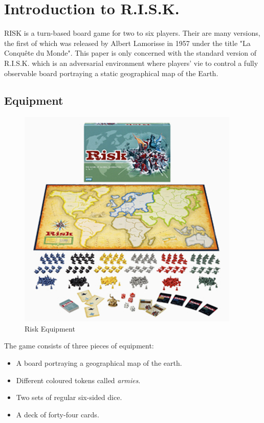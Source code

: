 \documentclass[parskip]{cs4rep}
\begin{document}
\newpage

\section{Introduction to R.I.S.K.}

RISK is a turn-based board game for two to six players. Their are many versions, the first of which was released by Albert Lamorisse in 1957 under the title "La Conqu\^ete du Monde". This paper is only concerned with the standard version of R.I.S.K. which is an adversarial environment where players' vie to control a fully observable board portraying a static geographical map of the Earth.

\subsection{Equipment}

\begin{figure}[h]
\centering
\includegraphics{images/risk-board}
\caption{Risk Equipment \cite{riskimage}}
\label{fig:risk-equipment}
\end{figure}

The game consists of three pieces of equipment:

\begin{itemize}
\item
A board portraying a geographical map of the earth.
\item
Different coloured tokens called \textit{armies}.
\item
Two sets of regular six-sided dice.
\item
A deck of forty-four cards.
\end{itemize}
\end{document}
